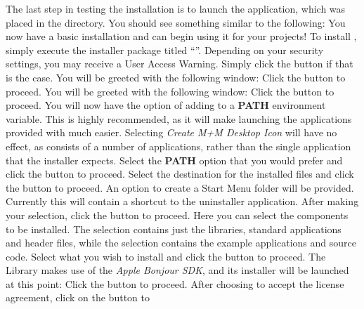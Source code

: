 The last step in testing the \mplusm{} installation is to launch the \emph{\MMMU}
application, which was placed in the 
directory.
You should see something similar to the following:
You now have a basic \mplusm{} installation and can begin using it for your projects!
\tertiaryEnd
\secondaryEnd
\condPage
{}
To install \mplusm, simply execute the installer package titled
``''.
Depending on your security settings, you may receive a User Access Warning.
Simply click the  button if that is the case.
You will be greeted with the following window:
Click the  button to proceed.
You will be greeted with the following window:
Click the  button to proceed.
\condPage{}
You will now have the option of adding \mplusm{} to a \textbf{PATH} environment variable.
This is highly recommended, as it will make launching the applications provided with
\mplusm{} much easier.
Selecting \emph{Create M+M Desktop Icon} will have no effect, as \mplusm{} consists of a
number of applications, rather than the single application that the installer expects.
Select the \textbf{PATH} option that you would prefer and click the 
button to proceed.
Select the destination for the installed files and click the  button to
proceed.
\condPage
{}
An option to create a Start Menu folder will be provided.
Currently this will contain a shortcut to the uninstaller application.
After making your selection, click the  button to proceed.
Here you can select the components to be installed.
The  selection contains just the libraries, standard applications and
header files, while the  selection contains the example applications
and source code.
Select what you wish to install and click the  button to proceed.
\condPage{}
The \mplusm{} Library makes use of the \emph{Apple Bonjour SDK}, and its installer will be
launched at this point:
Click the  button to proceed.
After choosing to accept the license agreement, click on the  button to
